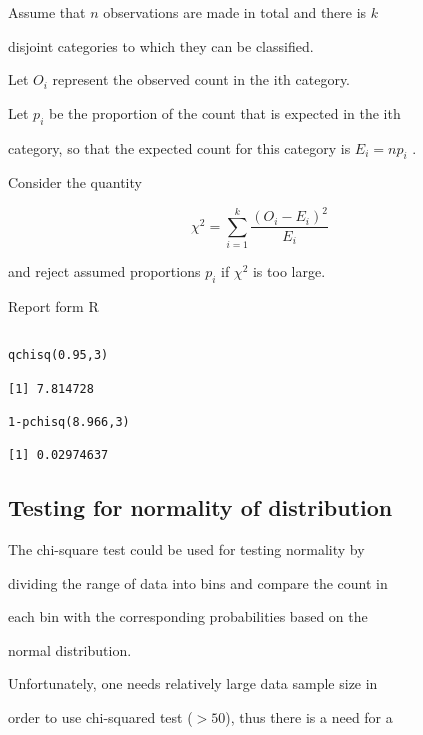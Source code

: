Assume that $n$ observations are made in total and there is $k$

disjoint categories to which they can be classified.

Let $O_i$ represent the observed count in the ith category.

Let $p_i$ be the proportion of the count that is expected in the ith

category, so that the expected count for this category is $E_i = np_i$ .

Consider the quantity

\[ \chi^2 = \sum^{k}_{i=1}\frac{(O_i-E_i)^2}{E_i} \]

 

and reject assumed proportions $p_i$ if $\chi^2$ is too large.

 






Report form R

\begin{verbatim}

qchisq(0.95,3)

[1] 7.814728

1-pchisq(8.966,3)

[1] 0.02974637

\end{verbatim}


 

\subsection{Testing for normality of distribution}

The chi-square test could be used for testing normality by

dividing the range of data into bins and compare the count in

each bin with the corresponding probabilities based on the

normal distribution.

Unfortunately, one needs relatively large data sample size in

order to use chi-squared test ($> 50$), thus there is a need for a

